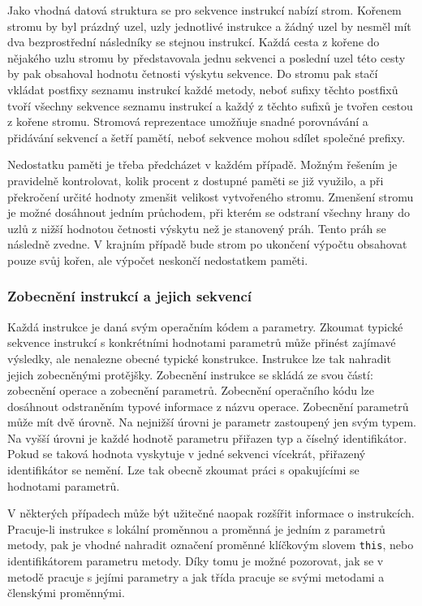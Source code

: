 Jako vhodná datová struktura se pro sekvence instrukcí nabízí strom. Kořenem stromu by byl prázdný uzel, uzly jednotlivé instrukce a žádný uzel by nesměl mít dva bezprostřední následníky se stejnou instrukcí. Každá cesta z kořene do nějakého uzlu stromu by představovala jednu sekvenci a poslední uzel této cesty by pak obsahoval hodnotu četnosti výskytu sekvence. Do stromu pak stačí vkládat postfixy seznamu instrukcí každé metody, neboť sufixy těchto postfixů tvoří všechny sekvence seznamu instrukcí a každý z těchto sufixů je tvořen cestou z kořene stromu. Stromová reprezentace umožňuje snadné porovnávání a přidávání sekvencí a šetří pamětí, neboť sekvence mohou sdílet společné prefixy.

Nedostatku paměti je třeba předcházet v každém případě. Možným řešením je pravidelně kontrolovat, kolik procent z dostupné paměti se již využilo, a při překročení určité hodnoty zmenšit velikost vytvořeného stromu. Zmenšení stromu je možné dosáhnout jedním průchodem, při kterém se odstraní všechny hrany do uzlů z nižší hodnotou četnosti výskytu než je stanovený práh. Tento práh se následně zvedne. V krajním případě bude strom po ukončení výpočtu obsahovat pouze svůj kořen, ale výpočet neskončí nedostatkem paměti.

\subsubsection{Zobecnění instrukcí a jejich sekvencí}

Každá instrukce je daná svým operačním kódem a parametry. Zkoumat typické sekvence instrukcí s konkrétními hodnotami parametrů může přinést zajímavé výsledky, ale nenalezne obecné typické konstrukce. Instrukce lze tak nahradit jejich zobecněnými protějšky. Zobecnění instrukce se skládá ze svou částí: zobecnění operace a zobecnění parametrů. Zobecnění operačního kódu lze dosáhnout odstraněním typové informace z názvu operace. Zobecnění parametrů může mít dvě úrovně. Na nejnižší úrovni je parametr zastoupený jen svým typem. Na vyšší úrovni je každé hodnotě parametru přiřazen typ a číselný identifikátor. Pokud se taková hodnota vyskytuje v jedné sekvenci vícekrát, přiřazený identifikátor se nemění. Lze tak obecně zkoumat práci s opakujícími se hodnotami parametrů.

V některých případech může být užitečné naopak rozšířit informace o instrukcích. Pracuje-li instrukce s lokální proměnnou a proměnná je jedním z parametrů metody, pak je vhodné nahradit označení proměnné klíčkovým slovem \texttt{this}, nebo identifikátorem parametru metody. Díky tomu je možné pozorovat, jak se v metodě pracuje s jejími parametry a jak třída pracuje se svými metodami a členskými proměnnými.


